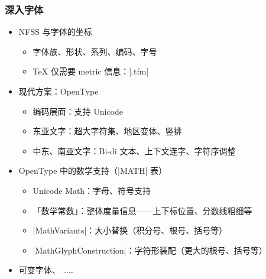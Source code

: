 \begin{frame}[fragile]
\frametitle{深入字体}
\begin{itemize}
  \item<+-> NFSS 与字体的坐标

    \begin{itemize}
      \item 字体族、形状、系列、编码、字号
      \item \TeX{} 仅需要 metric 信息：|.tfm|
    \end{itemize}

  \item<+-> 现代方案：OpenType

    \begin{itemize}
      \item 编码层面：支持 Unicode
      \item 东亚文字：超大字符集、地区变体、竖排
      \item 中东、南亚文字：Bi-di 文本、上下文连字、字符序调整
    \end{itemize}

  \item<+-> OpenType 中的数学支持（|MATH| 表）

    \begin{itemize}
      \item Unicode Math：字母、符号支持
      \item 「数学常数」：整体度量信息——上下标位置、分数线粗细等
      \item |MathVariants|：大小替换（积分号、根号、括号等）
      \item |MathGlyphConstruction|：字符形装配（更大的根号、括号等）
    \end{itemize}

  \item<+-> 可变字体、%
    ……
\end{itemize}
\end{frame}

